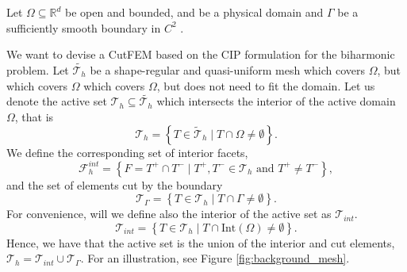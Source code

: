 Let $\Omega \subseteq    \mathbb{R} ^d$ be open and bounded, and be a physical domain and $\Gamma  $ be a sufficiently smooth boundary in $C^2$ .

We want to devise a CutFEM based on the CIP formulation for the biharmonic problem. Let $\widetilde{\mathcal{T}_{h} } $ be a shape-regular and quasi-uniform mesh which covers $\Omega $, but which covers $\Omega $ which covers $\Omega $, but does not need to fit the
domain. Let us denote the active set $\mathcal{T} _{h} \subseteq \widetilde{\mathcal{T}_{h}}$ which intersects the interior of the active domain $\Omega $, that is  \[
\mathcal{T} _{h} = \left\{ T \in \widetilde{\mathcal{T} }_{h}  \mid  T \cap \Omega   \neq \emptyset    \right\} .
\]
We define the corresponding set of interior facets, \[
    \mathcal{F} _{h}^{int} = \left\{ F = T^{+} \cap T^{-}  \mid  T^{+}, T^{-} \in \mathcal{T} _{h} \text{ and } T^{+} \neq T^{-} \right\},
\]
and the set of elements cut by the boundary \[
\mathcal{T} _{\Gamma } = \left\{ T \in \mathcal{T} _{h}   \mid  T \cap \Gamma \neq \emptyset  \right\}.
\]
For convenience, will we define also the interior of the active set as $\mathcal{T} _{int}$.
\[
\mathcal{T} _{int} = \left\{ T \in \mathcal{T} _{h}   \mid  T \cap  \mathrm{Int}(\Omega ) \neq \emptyset  \right\}.
\]
Hence, we have that the active set is the union of the interior and cut elements, $\mathcal{T} _{h} = \mathcal{T} _{int} \cup  \mathcal{T} _{\Gamma }$. For an illustration, see Figure \ref{fig:background_mesh}.



